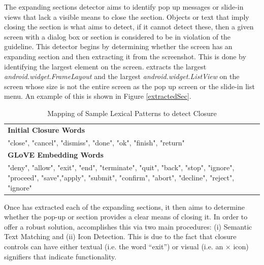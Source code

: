 The expanding sections detector aims to identify pop up messages or slide-in views that lack a visible means to close the section. Objects or text that imply closing the section is what \MotorEase aims to detect, if it cannot detect these, then a given screen with a dialog box or section is considered to be in violation of the guideline. 
This detector begins by determining whether the screen has an expanding section and then extracting it from the screenshot. This is done by identifying the largest element on the screen. \MotorEase extracts the largest \emph{android.widget.FrameLayout} and the largest \emph{android.widget.ListView} on the screen whose size is not the entire screen as the pop up screen or the slide-in list menu. %
An example of this is shown in Figure \ref{extractedSec}.

\begin{table}[h]
\centering
\small
\renewcommand{\arraystretch}{2}
\caption{Mapping of Sample Lexical Patterns to detect Closure}

\label{tab:text-patterns}
\begin{tabular}{p{15cm}}
\hline
\textbf{Initial Closure Words}\\

"close", "cancel", "dismiss", "done", "ok", "finish", "return"\\
\hline
\textbf{GLoVE Embedding Words}\\

 "deny", "allow", "exit", "end", "terminate", "quit", "back", "stop", "ignore",  "proceed", "save","apply", "submit", "confirm", "abort", "decline", "reject", "ignore"\\
\hline
\end{tabular}
\end{table}

Once \MotorEase has extracted each of the expanding sections, it then aims to determine whether the pop-up or section provides a clear means of closing it. In order to offer a robust solution, \MotorEase accomplishes this via two main procedures: (i) Semantic Text Matching and (ii) Icon Detection. This is due to the fact that closure controls can have either textual (i.e. the word ``exit'') or visual (i.e. an $\times$ icon) signifiers that indicate functionality.

